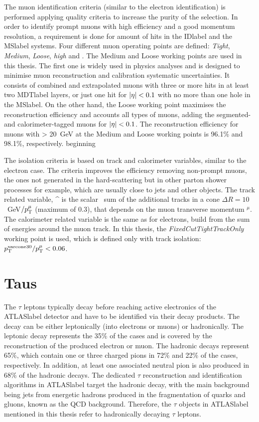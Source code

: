 The muon identification criteria (similar to the electron identification) is performed applying quality criteria to increase the purity of the selection. In order to identify prompt muons with high efficiency and a
good momentum resolution, a requirement is done for amount of hits in the \acrshort{IDlabel} and the \acrshort{MSlabel} systems. Four different muon operating points are defined: \textit{Tight}, \textit{Medium}, \textit{Loose}, \textit{high \pT} and . The Medium and Loose working points are used in this thesis. The first one is widely used in physics analyses and is designed to minimise muon reconstruction and calibration systematic uncertainties. It consists of combined and extrapolated muons with three or more hits in at least two \acrshort{MDTlabel} layers, or just one hit for $\abs{\eta}<0.1$ with no more than one hole in the \acrshort{MSlabel}. On the other hand, the Loose working point maximises the reconstruction efficiency and accounts all types of muons, adding the segmented- and calorimeter-tagged muons for $\abs{\eta}<0.1$. The reconstruction efficiency for muons with \pT > 20~GeV at the Medium and Loose working points is 96.1\% and 98.1\%, respectively. beginning 

The isolation criteria is based on track and calorimeter variables, similar to the electron case. The criteria improves the efficiency removing non-prompt muons, the ones not generated in the hard-scattering but in other parton shower processes for example, which are usually close to jets and other objects. The track related variable, \pT^{} is the scalar \pT\ sum of the additional tracks in a cone $\Delta R=10$~GeV$/p_{\text{T}}^\mu$ (maximum of 0.3), that depends on the muon transverse momentum \pT$^\mu$. The calorimeter related variable is the same as for electrons, build from the sum of energies around the muon track. In this thesis, the \textit{FixedCutTightTrackOnly} working point is used, which is defined only with track isolation: $p_{\text{T}}^\text{varcone30}/p_{\text{T}}^\mu<0.06$.       

\section{Taus}

The $\tau$ leptons typically decay before reaching active electronics of the \acrshort{ATLASlabel} detector and have to be identified via their decay products. The decay can be either leptonically (into electrons or muons) or hadronically. The leptonic decay represents the 35\% of the cases and is covered by the reconstruction of the produced electron or muon. The hadronic decays represent 65\%, which contain one or three charged pions in 72\% and 22\% of the cases, respectively. In addition, at least one associated neutral pion is also produced in 68\% of the hadronic decays. The dedicated $\tau$ reconstruction and identification algorithms in \acrshort{ATLASlabel} target the hadronic decay, with the main background being jets from energetic hadrons produced in the fragmentation of quarks and gluons, known as the \acrshort{QCD} background. Therefore, the $\tau$ objects in \acrshort{ATLASlabel} mentioned in this thesis refer to hadronically decaying $\tau$ leptons. 

